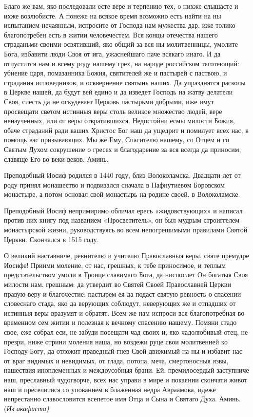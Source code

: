 Благо же вам, яко последовали есте вере и терпению тех, о нихже слышасте и ихже возлюбисте. А понеже на всякое время возможно есть найти на ны испытанием нечаянным, испросите от Господа нам мужества дар, иже толико благопотребен есть в житии человечестем. Вся концы отечества нашего страданьми своими освятивший, яко общий за вся ны молитвенницы, умолите Бога, избавити люди Своя от ига, ужаснейшаго паче всякаго инаго. И да отпустится нам и всему роду нашему грех, на народе российском тяготеющий: убиение царя, помазанника Божия, святителей же и пастырей с паствою, и страдания исповедников, и осквернение святынь наших. Да упразднятся расколы в Церкве нашей, да будут вей едино и да изведет Господь на жатву делатели Своя, сиесть да не оскудевает Церковь пастырьми добрыми, иже имут просвещати светом истинныя веры столь великое множество людей, вере ненаученных, или от веры отвратившихся. Недостойни есмы милости Божия, обаче страданий ради ваших Христос Бог наш да ущедрит и помилует всех нас, в помощь вас призывающих. Мы же Ему, Спасителю нашему, со Отцем и со Святым Духом сокрушение о гресех и благодарение за вся всегда да приносим, славяще Его во веки веков. Аминь.
\mychapterending



Преподобный Иосиф родился в 1440 году, близ Волоколамска. Двадцати лет от роду принял монашество и подвизался сначала в Пафнутиевом Боровском монастыре, а потом основал свой монастырь на родине своей, в Волоколамске. 

Преподобный Иосиф непримиримо обличал ересь «жидовствующих» и написал против них книгу под названием «Просветитель», он был мудрым строиггелем монастырской жизни, руководствуясь во всем непогрешимыми правилами Святой Церкви. Скончался в 1515 году.



О великий наставниче, ревнителю и учителю Православныя веры, святе премудре Иосифе! Приими моление, от нас, грешных, к тебе приносимое, и теплым предстательством умоли в Троице славимаго Бога, да ниспослет Он богатыя Своя милости нам, грешным: да утвердит во Святей Своей Православней Церкви правую веру и благочестие: пастырем ея да подаст святую ревность о спасении словеснаго стада, яко да верующих соблюдут, неверующих же и отпадших от истинныя веры вразумят и обратят. Всем же нам испроси вся благопотребная во временном сем житии и полезная к вечному спасению нашему. Помяни стадо свое, еже собрал еси, не забуди посещати чад своих и, яко чадолюбивый отец, не презри, ниже отрини моления наша, но воздежи руце свои молитвенней ко Господу Богу, да отложит праведный гнев Свой движимый на ны и избавит нас от враг видимых и невидимых, от глада, потопа, меча, смертоносныя язвы, нашествия иноплеменных и междоусобныя брани. Ей, премилосердый заступниче наш, преславный чудогворче, всех нас управи в мире и покаянии скончати живот наш и преселитися со упованием в блаженная недра Авраамова, идеже непрестанно славословится всепетое имя Отца и Сына и Святаго Духа. Аминь. (\itshape Из акафиста\normalfont{})
\longpage{}\mychapterending


